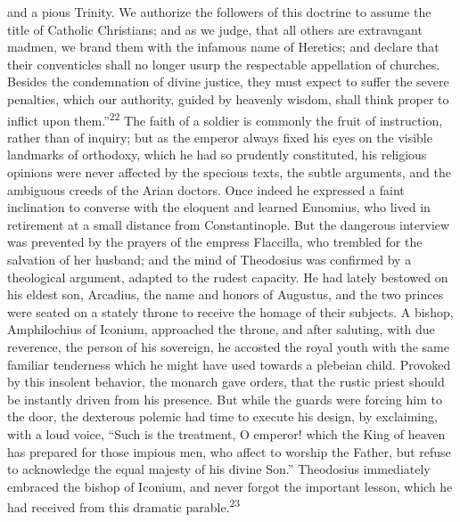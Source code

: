 and a pious Trinity. We authorize the followers of this doctrine
to assume the title of Catholic Christians; and as we judge, that
all others are extravagant madmen, we brand them with the
infamous name of Heretics; and declare that their conventicles
shall no longer usurp the respectable appellation of churches.
Besides the condemnation of divine justice, they must expect to
suffer the severe penalties, which our authority, guided by
heavenly wisdom, shall think proper to inflict upon them.”\textsuperscript{22} The
faith of a soldier is commonly the fruit of instruction, rather
than of inquiry; but as the emperor always fixed his eyes on the
visible landmarks of orthodoxy, which he had so prudently
constituted, his religious opinions were never affected by the
specious texts, the subtle arguments, and the ambiguous creeds of
the Arian doctors. Once indeed he expressed a faint inclination
to converse with the eloquent and learned Eunomius, who lived in
retirement at a small distance from Constantinople. But the
dangerous interview was prevented by the prayers of the empress
Flaccilla, who trembled for the salvation of her husband; and the
mind of Theodosius was confirmed by a theological argument,
adapted to the rudest capacity. He had lately bestowed on his
eldest son, Arcadius, the name and honors of Augustus, and the
two princes were seated on a stately throne to receive the homage
of their subjects. A bishop, Amphilochius of Iconium, approached
the throne, and after saluting, with due reverence, the person of
his sovereign, he accosted the royal youth with the same familiar
tenderness which he might have used towards a plebeian child.
Provoked by this insolent behavior, the monarch gave orders, that
the rustic priest should be instantly driven from his presence.
But while the guards were forcing him to the door, the dexterous
polemic had time to execute his design, by exclaiming, with a
loud voice, “Such is the treatment, O emperor! which the King of
heaven has prepared for those impious men, who affect to worship
the Father, but refuse to acknowledge the equal majesty of his
divine Son.” Theodosius immediately embraced the bishop of
Iconium, and never forgot the important lesson, which he had
received from this dramatic parable.\textsuperscript{23}



